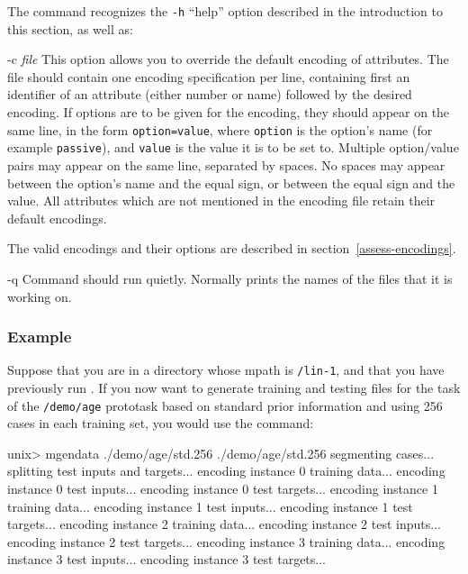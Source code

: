 The \mgendata{} command recognizes the \texttt{-h} ``help'' option described in
the introduction to this section, as well as:\vspace{-5pt}
\begin{ttdescription}

\item[-c {\rm\em file}] 
    This option allows you to override the default encoding of
    attributes.  The file should contain one encoding specification
    per line, containing first an identifier of an attribute (either
    number or name) followed by the desired encoding.  If options are
    to be given for the encoding, they should appear on the same line,
    in the form \texttt{option=value}, where \texttt{option} is the
    option's name (for example \texttt{passive}), and \texttt{value}
    is the value it is to be set to.  Multiple option/value pairs may
    appear on the same line, separated by spaces.  No spaces may
    appear between the option's name and the equal sign, or between
    the equal sign and the value.  All attributes which are not
    mentioned in the encoding file retain their default encodings.

    The valid encodings and their options are described in
    section~\ref{assess-encodings}.\vspace{-5pt}

\item[-q]
    Command should run quietly. Normally \mgendata{} prints the names of the
files that it is working on.


\end{ttdescription}

\subsubsection*{Example}

Suppose that you are in a directory whose mpath is \texttt{/lin-1},
and that you have previously run \mgendata.  If you now want to
generate training and testing files for the task of the
\texttt{/demo/age} prototask based on standard prior information and
using 256 cases in each training set, you would use the
command:\vspace{-5pt}
\begin{Session}
unix> mgendata ./demo/age/std.256
./demo/age/std.256
  segmenting cases...
  splitting test inputs and targets...
  encoding instance 0 training data...
  encoding instance 0 test inputs...
  encoding instance 0 test targets...
  encoding instance 1 training data...
  encoding instance 1 test inputs...
  encoding instance 1 test targets...
  encoding instance 2 training data...
  encoding instance 2 test inputs...
  encoding instance 2 test targets...
  encoding instance 3 training data...
  encoding instance 3 test inputs...
  encoding instance 3 test targets...
\end{Session}\vspace{-5pt}

